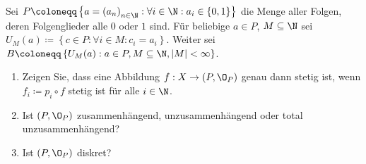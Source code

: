 \begin{assignment}
  Sei \( P \coloneqq \left \{ a = {(a_n)}_{n \in \N} : \forall i \in \N : a_i \in \left \{ 0,1 \right \} \right \} \) die Menge aller Folgen, deren Folgenglieder alle \( 0 \) oder \( 1 \) sind. Für beliebige \( a \in P \), \( M \subseteq \N \) sei \( U_M(a) \coloneqq \left \{ c \in P : \forall i \in M : c_i = a_i \right \} \). Weiter sei \( B \coloneqq \left \{ U_M(a) : a \in P, M \subseteq \N, \left\vert M \right\vert < \infty \right \} \).
  \begin{enumerate}[label=(\alph*)]
    \item Zeigen Sie, dass eine Abbildung \( f: X \to (P, \O_P) \) genau dann stetig ist, wenn \( f_i \coloneqq p_i \circ f \) stetig ist für alle \( i \in \N \).
    \item Ist \( (P, \O_P) \) zusammenhängend, unzusammenhängend oder total unzusammenhängend?
    \item Ist \( (P, \O_P) \) diskret?
  \end{enumerate}
\end{assignment}
